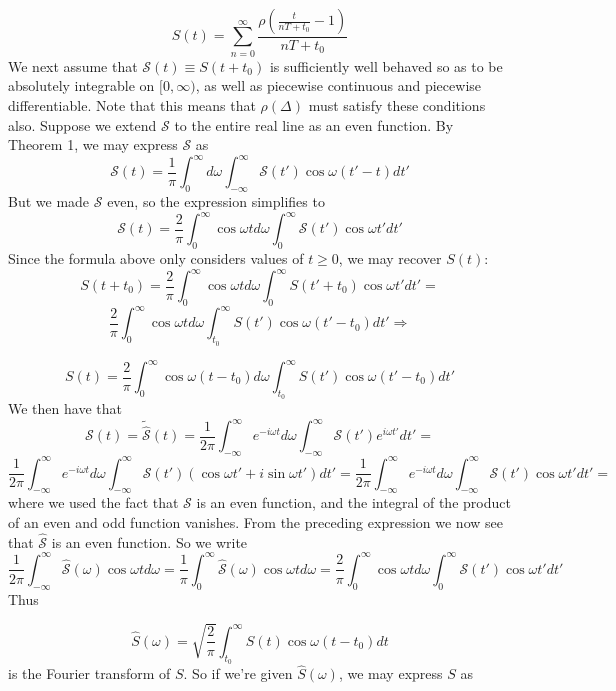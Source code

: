 \begin{equation}
S(t)=\sum^{\infty}_{n=0}\frac{\rho\left(\frac{t}{nT+t_0}-1\right)}{nT+t_0}
\end{equation}
We next assume that $\mathcal{S}(t)\equiv S(t+t_0)$ is sufficiently well behaved so as to be absolutely integrable on $[0,\infty)$, as well as piecewise continuous and piecewise differentiable. Note that this means that $\rho(\Delta)$ must satisfy these conditions also. Suppose we extend $\mathcal{S}$ to the entire real line as an even function. By Theorem 1, we may express $\mathcal{S}$ as \[\mathcal{S}(t)=\frac{1}{\pi}\int^{\infty}_0d\omega\int^{\infty}_{-\infty}\mathcal{S}(t')\cos\omega(t'-t)dt'\]  But we made $\mathcal{S}$ even, so the expression simplifies to \[\mathcal{S}(t)=\frac{2}{\pi}\int^{\infty}_0\cos\omega td\omega\int^{\infty}_0\mathcal{S}(t')\cos\omega t'dt'\] Since the formula above only considers values of $t\geq0$, we may recover $S(t)$:\[S(t+t_0)=\frac{2}{\pi}\int^{\infty}_0\cos\omega td\omega\int^{\infty}_0S(t'+t_0)\cos\omega t'dt'=\]\[\frac{2}{\pi}\int^{\infty}_0\cos\omega td\omega\int^{\infty}_{t_0}S(t')\cos\omega(t'-t_0)dt'\Rightarrow\]

\begin{equation}
S(t)=\frac{2}{\pi}\int^{\infty}_0\cos\omega(t-t_0)d\omega\int^{\infty}_{t_0}S(t')\cos\omega(t'-t_0)dt'
\end{equation} 
We then have that \[\mathcal{S}(t)=\tilde{\hat{\mathcal{S}}}(t)=\frac{1}{2\pi}\int^{\infty}_{-\infty}e^{-i\omega t}d\omega\int^{\infty}_{-\infty}\mathcal{S}(t')e^{i\omega t'}dt'=\]\[\frac{1}{2\pi}\int^{\infty}_{-\infty}e^{-i\omega t}d\omega\int^{\infty}_{-\infty}\mathcal{S}(t')(\cos\omega t'+i\sin\omega t')dt'=\frac{1}{2\pi}\int^{\infty}_{-\infty}e^{-i\omega t}d\omega\int^{\infty}_{-\infty}\mathcal{S}(t')\cos\omega t'dt'=\] where we used the fact that $\mathcal{S}$ is an even function, and the integral of the product of an even and odd function vanishes. From the preceding expression we now see that $\hat{\mathcal{S}}$ is an even function. So we write \[\frac{1}{2\pi}\int^{\infty}_{-\infty}\hat{\mathcal{S}}(\omega)\cos\omega td\omega=\frac{1}{\pi}\int^{\infty}_0\hat{\mathcal{S}}(\omega)\cos\omega td\omega=\frac{2}{\pi}\int^{\infty}_0\cos\omega td\omega\int^{\infty}_0\mathcal{S}(t')\cos\omega t'dt'\] Thus 

\begin{equation}
\hat{S}(\omega)=\sqrt{\frac{2}{\pi}}\int^{\infty}_{t_0}S(t)\cos\omega(t-t_0)dt
\end{equation} 
is the Fourier transform of $S$. So if we're given $\hat{S}(\omega)$, we may express $S$ as 

